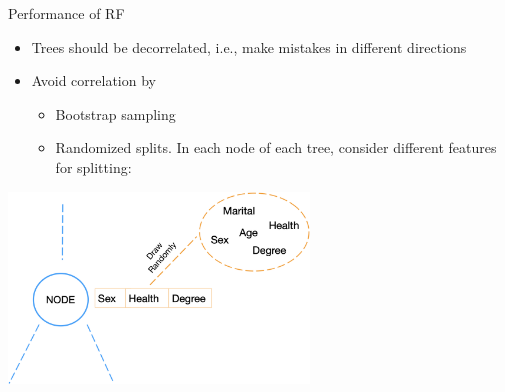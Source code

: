 \documentclass[11pt,compress,t,notes=noshow, xcolor=table]{beamer}
\begin{document}
\begin{vbframe}{Performance of RF}
\begin{itemize} 
\item \small Trees should be decorrelated, i.e., make mistakes in different directions
\item \small Avoid correlation by
    \begin{itemize}
        \item \small Bootstrap sampling 
        \item \small Randomized splits. In each node of each tree, consider different features for splitting:
    \end{itemize}
\end{itemize}

\vspace{0.5cm}
\begin{center}
  \includegraphics[width = 0.6\textwidth]{figure_man/nutshell-randomforest-random-split.png}
\end{center}




\end{vbframe}

\end{document}
